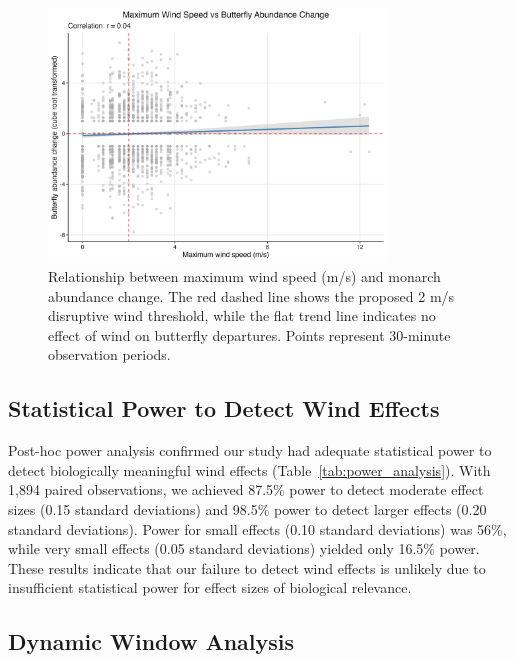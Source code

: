 \begin{figure}[htbp]
\centering
\includegraphics[width=0.8\textwidth]{figures/results/wind_hypothesis_scatter.png}
\caption{Relationship between maximum wind speed (m/s) and monarch abundance change. The red dashed line shows the proposed 2 m/s disruptive wind threshold, while the flat trend line indicates no effect of wind on butterfly departures. Points represent 30-minute observation periods.}\label{fig:wind_scatter}
\end{figure}

\subsection{Statistical Power to Detect Wind Effects}

Post-hoc power analysis confirmed our study had adequate statistical power to detect biologically meaningful wind effects (Table~\ref{tab:power_analysis}). With 1,894 paired observations, we achieved 87.5\% power to detect moderate effect sizes (0.15 standard deviations) and 98.5\% power to detect larger effects (0.20 standard deviations). Power for small effects (0.10 standard deviations) was 56\%, while very small effects (0.05 standard deviations) yielded only 16.5\% power. These results indicate that our failure to detect wind effects is unlikely due to insufficient statistical power for effect sizes of biological relevance.



\subsection{Dynamic Window Analysis}

